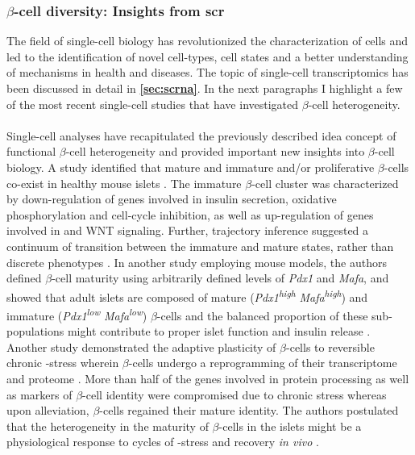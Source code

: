 
\subsubsection{$\beta$-cell diversity: Insights from \acrfull{scr}}
The field of single-cell biology has revolutionized the characterization of cells and led to the identification of novel cell-types, cell states and a better understanding of mechanisms in health and diseases. The topic of single-cell transcriptomics has been discussed in detail in \textbf{\autoref{sec:scrna}}. In the next paragraphs I highlight a few of the most recent single-cell studies that have investigated $\beta$-cell heterogeneity.\\\\ 
Single-cell analyses have recapitulated the previously described idea concept of functional $\beta$-cell heterogeneity and provided important new insights into $\beta$-cell biology. A study identified that mature and immature and/or proliferative $\beta$-cells co-exist in healthy mouse islets \textbf{\cite{sachs_targeted_2020}}. The immature $\beta$-cell cluster was characterized by down-regulation of genes involved in insulin secretion, oxidative phosphorylation and cell-cycle inhibition, as well as up-regulation of genes involved in  and WNT signaling. Further, trajectory inference %
suggested a continuum of transition between the immature and mature states, rather than discrete phenotypes \textbf{\cite{sachs_targeted_2020}}. In another study employing mouse models, the authors defined $\beta$-cell maturity using arbitrarily defined levels of \textit{Pdx1} and \textit{Mafa}, and showed that adult islets are composed of mature (\textit{Pdx1}\textsuperscript{\textit{high}} \textit{Mafa}\textsuperscript{\textit{high}}) and immature (\textit{Pdx1}\textsuperscript{\textit{low}} \textit{Mafa}\textsuperscript{\textit{low}}) $\beta$-cells and the balanced proportion of these sub-populations might contribute to proper islet function and insulin release \textbf{\cite{nasteska_pdx1low_2021}}. Another study demonstrated the adaptive plasticity of $\beta$-cells to reversible chronic -stress wherein $\beta$-cells undergo a reprogramming of their transcriptome and proteome \textbf{\cite{chen_adaptation_2022}}. More than half of the genes involved in  protein processing as well as markers of $\beta$-cell identity were compromised due to chronic stress whereas upon alleviation, $\beta$-cells regained their mature identity. The authors postulated that the heterogeneity in the maturity of $\beta$-cells in the islets might be a physiological response to cycles of -stress and recovery \textit{in vivo} \textbf{\cite{chen_adaptation_2022}}.\\\\

